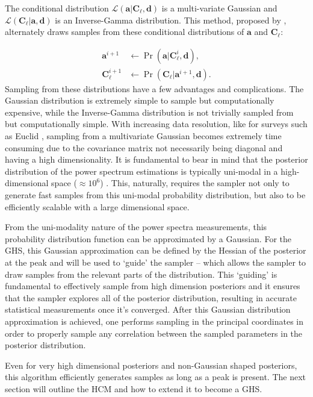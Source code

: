 \qquad The conditional distribution $\mathcal{L}(\mathbf{a}|\textbf{C}_{\ell},\mathbf{d})$ is a multi-variate Gaussian and $\mathcal{L}(\textbf{C}_{\ell}|\mathbf{a},\mathbf{d})$ is an Inverse-Gamma distribution. This method, proposed by \cite{Wandelt2004}, alternately draws samples from these conditional distributions of $\mathbf{a}$ and $\textbf{C}_{\ell}$:

\begin{align}
\mathbf{a}^{i+1} &\longleftarrow\Pr(\mathbf{a}|\textbf{C}_{\ell}^i,\mathbf{d}), \nonumber \\
\textbf{C}_{\ell}^{i+1} & \longleftarrow\Pr(\textbf{C}_{\ell}|\mathbf{a}^{i+1},\mathbf{d}).\nonumber
\end{align}
Sampling from these distributions have a few advantages and complications. The Gaussian distribution is extremely simple to sample but computationally expensive, while the Inverse-Gamma distribution is not trivially sampled from but computationally simple. With increasing data resolution, like for surveys such as Euclid \citep{2011EuclidRedPaper}, sampling from a multivariate Gaussian becomes extremely time consuming due to the covariance matrix not necessarily being diagonal and having a high dimensionality. It is fundamental to bear in mind that the posterior distribution of the power spectrum estimations is typically uni-modal in a high-dimensional space ($\approx 10^6$)  \citep{Taylor2008,Wandelt2004}. This, naturally, requires the sampler not only to generate fast samples from this uni-modal probability distribution, but also to be efficiently scalable with a large dimensional space. 

\qquad From the uni-modality nature of the power spectra measurements, this probability distribution function can be approximated by a Gaussian. For the GHS, this Gaussian approximation can be defined by the Hessian of the posterior at the peak and will be used to `guide' the sampler -- which allows the sampler to draw samples from the relevant parts of the distribution. This `guiding' is fundamental to effectively sample from high dimension posteriors and it ensures that the sampler explores all of the posterior distribution, resulting in accurate statistical measurements once it's converged. After this Gaussian distribution approximation is achieved, one performs sampling in the principal coordinates in order to properly sample any correlation between the sampled parameters in the posterior distribution. 

\qquad Even for very high dimensional posteriors and non-Gaussian shaped posteriors, this algorithm efficiently generates samples as long as a peak is present. The next section will outline the HCM and how to extend it to become a GHS.

